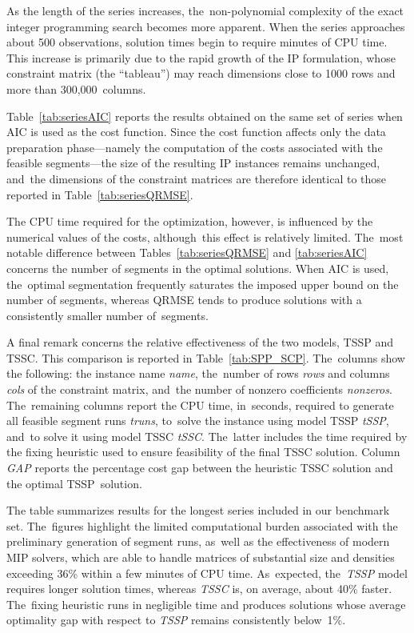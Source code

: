 \documentclass[mathematics,article,accept,pdftex,moreauthors]{Definitions/mdpi}
\begin{document}
As the length of the series increases, the~non-polynomial complexity of the exact integer programming search becomes more apparent. When the series approaches about 500 observations, solution times begin to require minutes of CPU time. This increase is primarily due to the rapid growth of the IP formulation, whose constraint matrix (the “tableau”) may reach dimensions close to 1000 rows and more than 300,000~columns.


Table~\ref{tab:seriesAIC} reports the results obtained on the same set of series when AIC is used as the cost function. Since the cost function affects only the data preparation phase—namely the computation of the costs associated with the feasible segments—the size of the resulting IP instances remains unchanged, and~the dimensions of the constraint matrices are therefore identical to those reported in Table~\ref{tab:seriesQRMSE}.

The CPU time required for the optimization, however, is influenced by the numerical values of the costs, although~this effect is relatively limited. The~most notable difference between Tables~\ref{tab:seriesQRMSE} and \ref{tab:seriesAIC} concerns the number of segments in the optimal solutions. When AIC is used, the~optimal segmentation frequently saturates the imposed upper bound on the number of segments, whereas QRMSE tends to produce solutions with a consistently smaller number of~segments.


A final remark concerns the relative effectiveness of the two models, TSSP and TSSC. This comparison is reported in Table~\ref{tab:SPP_SCP}. The~columns show the following: the instance name {\it name}, the~number of rows {\it rows} and columns {\it cols} of the constraint matrix, and~the number of nonzero coefficients {\it nonzeros}. The~remaining columns report the CPU time, in~seconds, required to generate all feasible segment runs {\it truns}, to~solve the instance using model TSSP {\it tSSP}, and~to solve it using model TSSC {\it tSSC}. The~latter includes the time required by the fixing heuristic used to ensure feasibility of the final TSSC solution. Column {\it GAP} reports the percentage cost gap between the heuristic TSSC solution and the optimal TSSP~solution.

The table summarizes results for the longest series included in our benchmark set. The~figures highlight the limited computational burden associated with the preliminary generation of segment runs, as~well as the effectiveness of modern MIP solvers, which are able to handle matrices of substantial size and densities exceeding 36\% within a few minutes of CPU time. As~expected, the~{\it TSSP} model requires longer solution times, whereas {\it TSSC} is, on average, about 40\% faster. The~fixing heuristic runs in negligible time and produces solutions whose average optimality gap with respect to {\it TSSP} remains consistently below~1\%.
\end{document}
